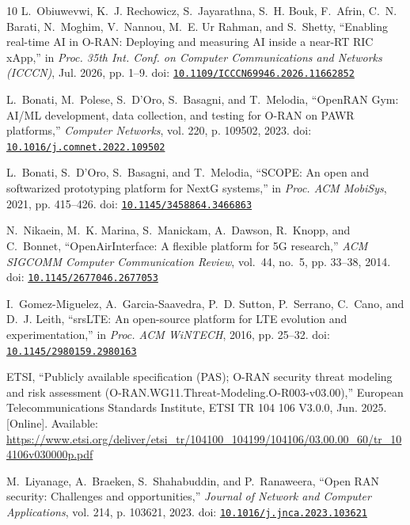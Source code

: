 \begin{thebibliography}{10}
L.~Obiuwevwi, K.~J. Rechowicz, S.~Jayarathna, S.~H. Bouk, F.~Afrin, C.~N.
  Barati, N.~Moghim, V.~Nannou, M.~E. {Ur Rahman}, and S.~Shetty, ``Enabling
  real-time {AI} in {O-RAN}: Deploying and measuring {AI} inside a near-{RT}
  {RIC} {xApp},'' in \emph{Proc. 35th Int. Conf. on Computer Communications and
  Networks (ICCCN)}, Jul. 2026, pp. 1--9. doi:
  \href{https://doi.org/10.1109/ICCCN69946.2026.11662852}{\nolinkurl{10.1109/ICCCN69946.2026.11662852}}

L.~Bonati, M.~Polese, S.~D'Oro, S.~Basagni, and T.~Melodia, ``{OpenRAN Gym}:
  {AI/ML} development, data collection, and testing for {O-RAN} on {PAWR}
  platforms,'' \emph{Computer Networks}, vol. 220, p. 109502, 2023. doi:
  \href{https://doi.org/10.1016/j.comnet.2022.109502}{\nolinkurl{10.1016/j.comnet.2022.109502}}

L.~Bonati, S.~D'Oro, S.~Basagni, and T.~Melodia, ``{SCOPE}: An open and
  softwarized prototyping platform for {NextG} systems,'' in \emph{Proc. ACM
  MobiSys}, 2021, pp. 415--426. doi:
  \href{https://doi.org/10.1145/3458864.3466863}{\nolinkurl{10.1145/3458864.3466863}}

N.~Nikaein, M.~K. Marina, S.~Manickam, A.~Dawson, R.~Knopp, and C.~Bonnet,
  ``{OpenAirInterface}: A flexible platform for {5G} research,'' \emph{ACM
  SIGCOMM Computer Communication Review}, vol.~44, no.~5, pp. 33--38, 2014.
  doi:
  \href{https://doi.org/10.1145/2677046.2677053}{\nolinkurl{10.1145/2677046.2677053}}

I.~Gomez-Miguelez, A.~Garcia-Saavedra, P.~D. Sutton, P.~Serrano, C.~Cano, and
  D.~J. Leith, ``{srsLTE}: An open-source platform for {LTE} evolution and
  experimentation,'' in \emph{Proc. ACM WiNTECH}, 2016, pp. 25--32. doi:
  \href{https://doi.org/10.1145/2980159.2980163}{\nolinkurl{10.1145/2980159.2980163}}

\BIBentryALTinterwordspacing
{ETSI}, ``Publicly available specification ({PAS}); {O-RAN} security threat
  modeling and risk assessment ({O-RAN.WG11.Threat-Modeling.O-R003-v03.00}),''
  European Telecommunications Standards Institute, ETSI TR 104 106 V3.0.0, Jun.
  2025. [Online]. Available:
  \url{https://www.etsi.org/deliver/etsi_tr/104100_104199/104106/03.00.00_60/tr_104106v030000p.pdf}
\BIBentrySTDinterwordspacing

M.~Liyanage, A.~Braeken, S.~Shahabuddin, and P.~Ranaweera, ``Open {RAN}
  security: Challenges and opportunities,'' \emph{Journal of Network and
  Computer Applications}, vol. 214, p. 103621, 2023. doi:
  \href{https://doi.org/10.1016/j.jnca.2023.103621}{\nolinkurl{10.1016/j.jnca.2023.103621}}


\end{thebibliography}
